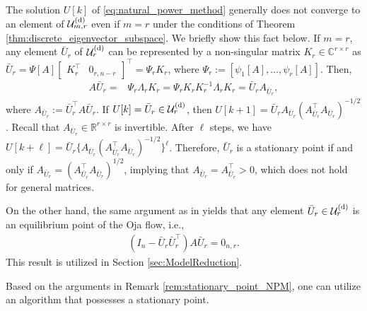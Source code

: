 \documentclass{ifacconf}
\begin{document}
\begin{rem} \label{rem:stationary_point_NPM}
The solution $U[k]$ of \eqref{eq:natural_power_method} generally does not converge to an element of $\mathcal{U}_{m,r}^{\rm (d)}$ even if $m=r$ under the conditions of Theorem \ref{thm:discrete_eigenvector_subspace}. 
We briefly show this fact below. 
If $m=r$, any element $\bar{U}_{r}$ of $\mathcal{U}_{r}^{\rm (d)}$ can be represented by a non-singular matrix $K_{r} \in \mathbb{C}^{r\times r}$ as $\bar{U} _{r} = \Psi [A] \begin{bmatrix}
    K_{r}^{\top} & 0 _{r,n-r}
    \end{bmatrix} ^{\top} 
    =
    \Psi _{r} K_{r}$, 
where $\Psi _{r} := [\psi _{1}[A],\dots , \psi _{r} [A]]$. 
Then, 
\begin{align}
    A \bar{U}_{r} = & \Psi _{r} \Lambda _{r} K_{r}
    = 
    \Psi _{r} K_{r} K_{r}^{-1} \Lambda _{r} K_{r} =  \bar{U} _{r}A_{\bar{U}_{r}}, 
    \label{eq:exponential_property}
\end{align}
where $A_{\bar{U}_{r}} := \bar{U}_{r}^{\top}A\bar{U}_{r} $.  
If $U[k] = \bar{U}_{r} \in \mathcal{U}_{r}^{\rm (d)}$, then $U[k+1] =  \bar{U}_{r} A_{\bar{U}_{r}} (A_{\bar{U}_{r}}^{\top} A_{\bar{U}_{r}}) ^{-1/2}$.
Recall that $A_{\bar{U}_r} \in \mathbb{R}^{r\times r}$ is invertible. After $\ell$ steps, we have $U[k+ \ell ] = \bar{U}_{r} \{ A_{\bar{U}_{r}} (A_{\bar{U}_{r}}^{\top} A_{\bar{U}_{r}}) ^{-1/2} \} ^{\ell}$. 
Therefore, $\bar{U}_{r}$ is a stationary point if and only if $A_{\bar{U}_{r}} = (A_{\bar{U}_{r}}^{\top} A_{\bar{U}_{r}}) ^{1/2}$, implying that $A_{\bar{U}_{r}} =A_{\bar{U}_{r}} ^{\top} >0$, which does not hold for general matrices. 

On the other hand, the same argument as in \cite[Prop. 2]{TsuzukiOhki2024} yields that any element $\bar{U}_{r} \in \mathcal{U}_{r}^{\rm (d)}$ is an equilibrium point of the Oja flow, i.e.,
\begin{align}
    (I_{n} - \bar{U}_{r} \bar{U}_{r}^{\top} ) A \bar{U}_{r} = 0_{n,r}.
    \label{eq:equillibrium_Oja_flow}
\end{align}
This result is utilized in Section \ref{sec:ModelReduction}.
\end{rem}

Based on the arguments in Remark \ref{rem:stationary_point_NPM}, one can utilize an algorithm that possesses a stationary point.
\end{document}
